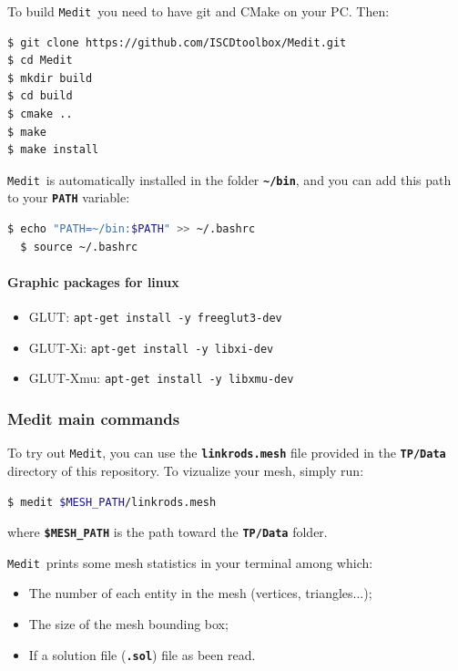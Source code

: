 \documentclass{article}
\newcommand{\ttb}[1]{\texttt{\textbf{#1}}}
\newcommand{\medit}{\texttt{Medit}}
\begin{document}
To build \medit\, you need to have git and CMake on your PC. Then:
\begin{lstlisting}[language=bash]
$ git clone https://github.com/ISCDtoolbox/Medit.git
$ cd Medit
$ mkdir build
$ cd build
$ cmake ..
$ make
$ make install
\end{lstlisting}
\medit\ is automatically installed in the folder \ttb{\textasciitilde/bin}, and you can add this path to your \ttb{PATH}
  variable:
\begin{lstlisting}[language=bash]
  $ echo "PATH=~/bin:$PATH" >> ~/.bashrc
  $ source ~/.bashrc

\end{lstlisting}

\paragraph{Graphic packages for linux}
\begin{itemize}
\item GLUT: \tt{apt-get install -y freeglut3-dev}
\item GLUT-Xi: \tt{apt-get install -y libxi-dev}
\item GLUT-Xmu: \tt{apt-get install -y libxmu-dev}
\end{itemize}


\subsubsection{Medit main commands}
To try out \medit, you can use the \ttb{linkrods.mesh} file provided in the \ttb{TP/Data} directory of this repository. To vizualize your mesh, simply run:
\begin{lstlisting}[language=bash]
$ medit $MESH_PATH/linkrods.mesh
\end{lstlisting}
where \ttb{\$MESH\_PATH} is the path toward the \ttb{TP/Data} folder. 

\medit\ prints some mesh statistics in your terminal among which:
\begin{itemize}
\item The number of each entity in the mesh (vertices, triangles...);
\item The size of the mesh bounding box;
\item If a solution file (\ttb{.sol}) file as been read.\\
\end{itemize}
\end{document}

